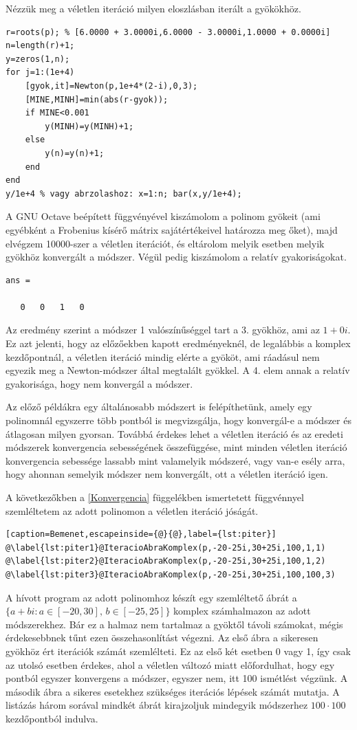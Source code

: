 \documentclass[a4paper,12pt]{report}
\begin{document}
				Nézzük meg a véletlen iteráció milyen eloszlásban iterált a gyökökhöz. 
				\begin{lstlisting}[caption=Bemenet]
r=roots(p); % [6.0000 + 3.0000i,6.0000 - 3.0000i,1.0000 + 0.0000i]
n=length(r)+1;
y=zeros(1,n);
for j=1:(1e+4)
	[gyok,it]=Newton(p,1e+4*(2-i),0,3);
	[MINE,MINH]=min(abs(r-gyok));
	if MINE<0.001
		y(MINH)=y(MINH)+1;
	else
		y(n)=y(n)+1;
	end
end
y/1e+4 % vagy abrzolashoz: x=1:n; bar(x,y/1e+4);
				\end{lstlisting} 
				A GNU Octave beépített függvényével kiszámolom a polinom gyökeit (ami egyébként a Frobenius kísérő mátrix sajátértékeivel határozza meg őket), majd elvégzem 10000-szer a véletlen iterációt, és eltárolom melyik esetben melyik gyökhöz konvergált a módszer. Végül pedig kiszámolom a relatív gyakoriságokat.
				\begin{lstlisting}[caption= Eredm\'eny]
ans =

   0   0   1   0
				\end{lstlisting} 
                Az eredmény szerint a módszer 1 valószínűséggel tart a 3. gyökhöz, ami az $1+0i$. Ez azt jelenti, hogy az előzőekben kapott eredményeknél, de legalábbis a komplex kezdőpontnál, a véletlen iteráció mindig elérte a gyököt, ami ráadásul nem egyezik meg a Newton-módszer által megtalált gyökkel. A 4. elem annak a relatív gyakorisága, hogy nem konvergál a módszer. 

				Az előző példákra egy általánosabb módszert is felépíthetünk, amely egy polinomnál egyszerre több pontból is megvizsgálja, hogy konvergál-e a módszer és átlagosan milyen gyorsan. Továbbá érdekes lehet a véletlen iteráció és az eredeti módszerek konvergencia sebességének összefüggése, mint minden véletlen iteráció konvergencia sebessége lassabb mint valamelyik módszeré, vagy van-e esély arra, hogy ahonnan semelyik módszer nem konvergált, ott a véletlen iteráció igen.
				
				A következőkben a \ref{Konvergencia} függelékben ismertetett függvénnyel szemléltetem az adott polinomon a véletlen iteráció jóságát.
				\begin{lstlisting}[caption=Bemenet,escapeinside={@}{@},label={lst:piter}]
@\label{lst:piter1}@IteracioAbraKomplex(p,-20-25i,30+25i,100,1,1)
@\label{lst:piter2}@IteracioAbraKomplex(p,-20-25i,30+25i,100,1,2)
@\label{lst:piter3}@IteracioAbraKomplex(p,-20-25i,30+25i,100,100,3)
				\end{lstlisting}
				A hívott program az adott polinomhoz készít egy szemléltető ábrát a $\{a+bi:a\in[-20,30],\,b\in[-25,25]\}$ komplex számhalmazon az adott módszerekhez. Bár ez a halmaz nem tartalmaz a gyöktől távoli számokat, mégis érdekesebbnek tűnt ezen összehasonlítást végezni. Az első ábra a sikeresen gyökhöz ért iterációk számát szemlélteti. Ez az első két esetben 0 vagy 1, így csak az utolsó esetben érdekes, ahol a véletlen változó miatt előfordulhat, hogy egy pontból egyszer konvergens a módszer, egyszer nem, itt 100 ismétlést végzünk. A második ábra a sikeres esetekhez szükséges iterációs lépések számát mutatja. A listázás három sorával mindkét ábrát kirajzoljuk mindegyik módszerhez $100\cdot 100$ kezdőpontból indulva.
				
\end{document}
